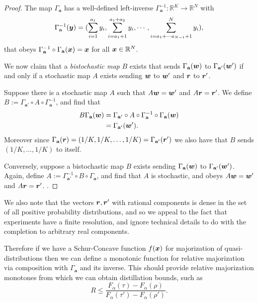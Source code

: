 \documentclass[pra,
aps,
twocolumn,
superscriptaddress,
groupedaddress,
nofootinbib,
reprint
]{revtex4-1}
\begin{document}
\begin{proof}
 The map $\Gamma_{\mathbf{a}}$ has a well-defined left-inverse $\Gamma^{-1}_{\mathbf{a}}: \mathbb{R}^K \rightarrow \mathbb{R}^N$ with 
\begin{equation}
\Gamma^{-1}_{\mathbf{a}}(\boldsymbol{y}) = ( \sum_{i=1}^{a_1} y_i,  \sum_{i=a_1 +1}^{a_1+a_2} y_i, \cdots ,  \sum_{i=a_1 +\cdots a_{N-1}+1}^{N} y_i),
\end{equation}
that obeys $\Gamma^{-1}_{\mathbf{a}} \circ \Gamma_{\mathbf{a}} (\boldsymbol{x}) = \boldsymbol{x}$ for all $\boldsymbol{x} \in \mathbb{R}^N$. 

We now claim that a \emph{bistochastic map} $B$ exists that sends $\Gamma_{\mathbf{a}}(\boldsymbol{w})$ to $\Gamma_{\mathbf{a}'}(\boldsymbol{w}')$ if and only if a stochastic map $A$ exists sending $\boldsymbol{w}$ to $\boldsymbol{w}'$ and $\boldsymbol{r}$ to $\boldsymbol{r}'$.

Suppose there is a stochastic map $A$ such that $A\boldsymbol{w}=\boldsymbol{w}'$ and $A\boldsymbol{r} = \boldsymbol{r}'$. We define $B := \Gamma_{\mathbf{a}'} \circ A \circ \Gamma_{\mathbf{a}}^{-1}$, and find that
\begin{align}
B \Gamma_{\mathbf{a}}(\boldsymbol{w}) &=\Gamma_{\mathbf{a}'} \circ A \circ \Gamma_{\mathbf{a}}^{-1}\circ\Gamma_{\mathbf{a}}(\boldsymbol{w}) \nonumber \\
&=\Gamma_{\mathbf{a}'} (\boldsymbol{w}').
\end{align}Moreover since $\Gamma_{\mathbf{a}} (\boldsymbol{r}) = (1/K, 1/K, \dots, 1/K)=\Gamma_{\mathbf{a}'} (\boldsymbol{r}') $ we also have that $B$ sends $(1/K, \dots ,1/K)$ to itself. 

Conversely, suppose a bistochastic map $B$ exists sending $\Gamma_{\mathbf{a}}(\boldsymbol{w})$ to $\Gamma_{\mathbf{a}'}(\boldsymbol{w}')$. Again, define  $A := \Gamma_{\mathbf{a}'}^{-1} \circ B \circ \Gamma_{\mathbf{a}}$, and find that $A$ is stochastic, and obeys $A\boldsymbol{w} = \boldsymbol{w}'$ and $A\boldsymbol{r}=\boldsymbol{r}'$. .
\end{proof}
We also note that the vectors $\boldsymbol{r}, \boldsymbol{r}'$ with rational components is dense in the set of all positive probability distributions, and so we appeal to the fact that experiments have a finite resolution, and ignore technical details to do with the completion to arbitrary real components.

Therefore if we have a Schur-Concave function $f(\boldsymbol{x})$ for majorization of quasi-distributions then we can define a monotonic function for relative majorization via composition with $\Gamma_{\mathbf{a}}$ and its inverse.
This should provide relative majorization monotones from which we can obtain distillation bounds, such as
\begin{equation}
R \le \frac{F_\alpha(\tau) - F_\alpha (\rho)}{F_\alpha(\tau') - F_\alpha (\rho')}.
\end{equation}
\end{document}

